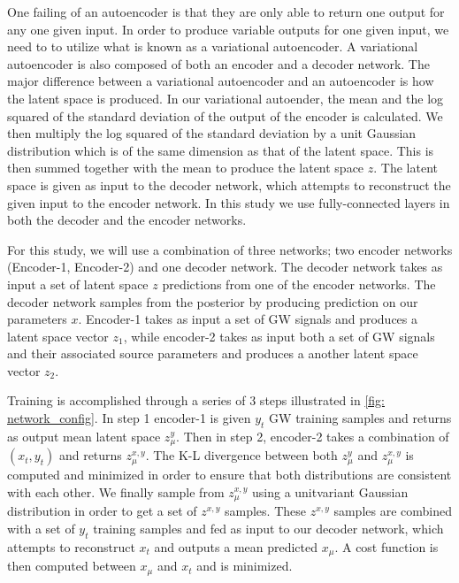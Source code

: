 \documentclass{nature}
\begin{document}
%
%
One failing of an autoencoder is that they are only able to return one 
output for any one given input. In order to produce variable outputs for 
one given input, we need to to utilize what is known as a variational autoencoder.
A variational autoencoder is also composed of both an encoder and a decoder network. 
The major difference between a variational autoencoder and an autoencoder is how the 
latent space is produced. In our variational autoender, the mean and the log squared 
of the standard deviation of the output of the encoder is calculated. We then multiply 
the log squared of the standard deviation by a unit Gaussian distribution which is 
of the same dimension as that of the latent space. This is then summed together 
with the mean to produce the latent space $z$. The latent space is given as input 
to the decoder network, which attempts to reconstruct the given input to 
the encoder network. In this study we use fully-connected layers in 
both the decoder and the encoder networks.

%
%
For this study, we will use a combination of three networks; two encoder networks (Encoder-1, Encoder-2) 
and one decoder network. The decoder network takes as input a set of latent space 
$z$ predictions from one of the encoder networks. The decoder network samples from 
the posterior by producing prediction on our parameters $x$. Encoder-1 takes as 
input a set of GW signals and produces a latent space vector $z_1$, while encoder-2 
takes as input both a set of GW signals and their associated source parameters 
and produces a another latent space vector $z_2$.

%
%
Training is accomplished through a series of 3 steps illustrated in \ref{fig: network_config}. 
In step 1 encoder-1 is given $y_t$ GW training samples and returns as output mean
latent space $z^{y}_{\mu}$. Then in step 2, encoder-2 takes a combination of $(x_{t},y_{t})$ 
and returns $z^{x,y}_{\mu}$. The K-L divergence between both $z^{y}_{\mu}$ and $z^{x,y}_{\mu}$ is 
computed and minimized in order to ensure that both distributions are consistent with each other. 
We finally sample from $z^{x,y}_{\mu}$ using a unitvariant Gaussian distribution 
in order to get a set of $z^{x,y}$ samples. These $z^{x,y}$ samples are combined with 
a set of $y_t$ training samples and fed as input to our decoder network, which attempts 
to reconstruct $x_t$ and outputs a mean predicted $x_{\mu}$. A cost function is then 
computed between $x_{\mu}$ and $x_t$ and is minimized.
\end{document}
